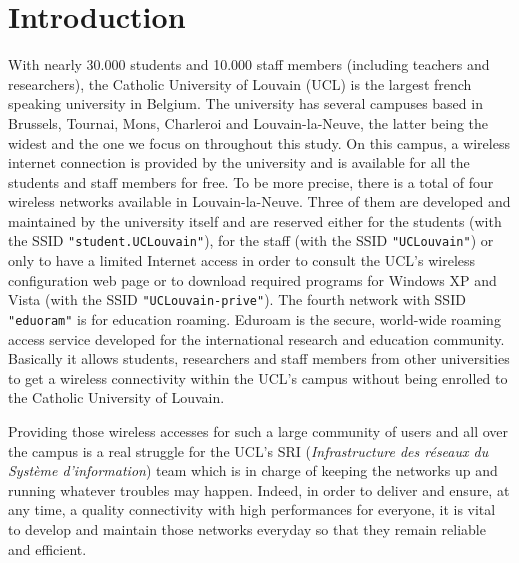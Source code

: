 
\chapter{Introduction} %

\label{Chapter1} %


With nearly 30.000 students and 10.000 staff members (including teachers and researchers), the Catholic University of Louvain (UCL) is the largest french speaking university in Belgium. The university has several campuses based in Brussels, Tournai, Mons, Charleroi and Louvain-la-Neuve, the latter being the widest and the one we focus on throughout this study. On this campus, a wireless internet connection is provided by the university and is available for all the students and staff members for free. To be more precise, there is a total of four wireless networks available in Louvain-la-Neuve. Three of them are developed and maintained by the university itself and are reserved either for the students (with the SSID \texttt{"student.UCLouvain"}), for the staff (with the SSID \texttt{"UCLouvain"}) or only to have a limited Internet access in order to consult the UCL's wireless configuration web page or to download required programs  for Windows XP and Vista (with the SSID \texttt{"UCLouvain-prive"}). The fourth network with SSID \texttt{"eduoram"} is for education roaming. Eduroam is the secure, world-wide roaming access service developed for the international research and education community\cite{eduroam1}. Basically it allows students, researchers and staff members from other universities to get a wireless connectivity within the UCL's campus without being enrolled to the Catholic University of Louvain.

Providing those wireless accesses for such a large community of users and all over the campus is a real struggle for the UCL's SRI (\textit{Infrastructure des réseaux du Système d'information}) team which is in charge of keeping the networks up and running whatever troubles may happen. Indeed, in order to deliver and ensure, at any time, a quality connectivity with high performances for everyone, it is vital to develop and maintain those networks everyday so that they remain reliable and efficient.
 

